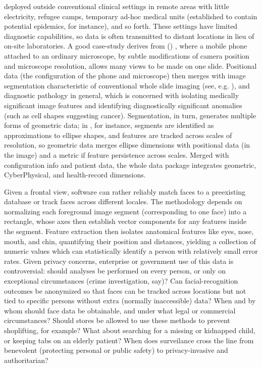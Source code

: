 {\begin{description}
deployed outside conventional clinical settings 
\mdash{} in remote areas with little electricity, refugee 
camps, temporary ad-hoc medical units (established 
to contain potential epidemics, for instance), and 
so forth.  These settings have limited diagnostic 
capabilities, so data is often transmitted to distant 
locations in lieu of on-site laboratories.  A 
good case-study derives from  
(\mWSI{}) \cite{Auguste}, where a mobile 
phone attached to an ordinary microscope, 
by subtle modifications of camera position and microscope 
resolution, allows many views to be made on one slide.  
Positional data (the configuration of the phone and microscope) 
then merges with image segmentation characteristic of 
conventional whole slide imaging (see, e.g. \cite{Farahani}), 
and diagnostic pathology 
in general, which 
is concerned with isolating medically significant image 
features and identifying diagnostically significant 
anomalies (such as cell shapes 
suggesting cancer).  Segmentation, in turn, 
generates multiple forms of geometric data; in 
\cite{KaleAksoy}, for instance, segments are 
identified as approximations to ellipse shapes, 
and features are tracked across scales of resolution, 
so geometric data merges ellipse dimensions with 
positional data (in the image) and a metric 
if feature persistence across scales.  Merged with 
\mWSI{} configuration info and patient data, the 
whole data package integrates geometric, CyberPhysical, 
and health-record dimensions. 
  
\item[Facial Recognition]  Given a frontal view, software can 
rather reliably match faces to a preexisting database or 
track faces across different locales.  The methodology depends 
on normalizing each foreground image segment (corresponding to 
one face) into a rectangle, whose axes then establish vector 
components for any features inside the segment.  Feature extraction 
then isolates anatomical features like eyes, nose, mouth, and 
chin, quantifying their position and distances, yielding a 
collection of numeric values which can statistically 
identify a person with relatively small error rates.  
Given privacy concerns, enterprise or government use 
of this data is controversial: should analyses be performed 
on every person, or only on exceptional circumstances 
(crime investigation, say)?  Can facial-recognition outcomes 
be anonymized so that faces can be tracked across locations 
but not tied to specific persons without extra (normally 
inaccessible) data?  When and by whom should face data be 
obtainable, and under what legal or commercial circumstances?  
Should stores be allowed to use these methods to 
prevent shoplifting, for example?  What about searching 
for a missing or kidnapped child, or keeping tabs on an 
elderly patient?  When does surveilance cross the line 
from benevolent (protecting personal or public safety) 
to privacy-invasive and authoritarian?
\end{description}
}
